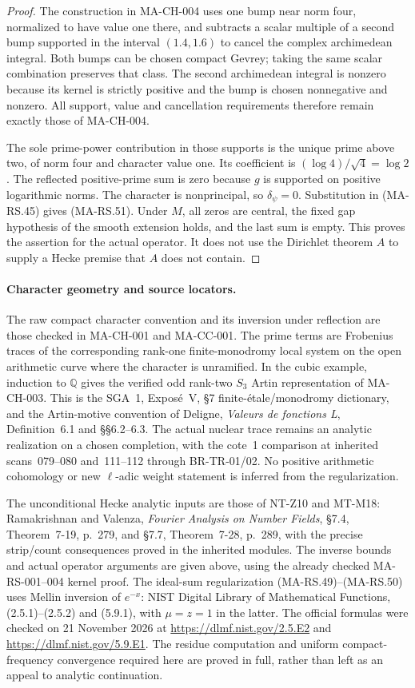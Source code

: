\begin{proof}
The construction in MA-CH-004 uses one bump near norm four,
normalized to have value one there, and subtracts a scalar
multiple of a second bump supported in the interval $(1.4,1.6)$
to cancel the complex archimedean integral. Both bumps can be
chosen compact Gevrey; taking the same scalar combination
preserves that class. The second archimedean integral is nonzero
because its kernel is strictly positive and the bump is chosen
nonnegative and nonzero. All support, value and cancellation
requirements therefore remain exactly those of MA-CH-004.

The sole prime-power contribution in those supports is the
unique prime above two, of norm four and character value one.
Its coefficient is $(\log4)/\sqrt4=\log2$.
The reflected positive-prime sum is zero because $g$ is
supported on positive logarithmic norms. The character is
nonprincipal, so $\delta_\psi=0$. Substitution in (MA-RS.45)
gives (MA-RS.51). Under $M$, all zeros are central, the fixed
gap hypothesis of the smooth extension holds, and the last sum
is empty. This proves the assertion for the actual operator.
It does not use the Dirichlet theorem $A$ to supply a Hecke
premise that $A$ does not contain.
\end{proof}

\paragraph{Character geometry and source locators.}
The raw compact character convention and its inversion under
reflection are those checked in MA-CH-001 and MA-CC-001.
The prime terms are Frobenius traces of the corresponding
rank-one finite-monodromy local system on the open arithmetic
curve where the character is unramified. In the cubic example,
induction to $\mathbb Q$ gives the verified odd rank-two
$S_3$ Artin representation of MA-CH-003.
This is the SGA~1, Expos\'e~V, \S7 finite-\'etale/monodromy
dictionary, and the Artin-motive convention of Deligne,
\emph{Valeurs de fonctions L}, Definition~6.1 and \S\S6.2--6.3.
The actual nuclear trace remains an analytic realization on a
chosen completion, with the cote~1 comparison at inherited
scans~079--080 and~111--112 through BR-TR-01/02.
No positive arithmetic cohomology or new $\ell$-adic weight
statement is inferred from the regularization.

The unconditional Hecke analytic inputs are those of NT-Z10
and MT-M18: Ramakrishnan and Valenza, \emph{Fourier Analysis on
Number Fields}, \S7.4, Theorem~7-19, p.~279, and \S7.7,
Theorem~7-28, p.~289, with the precise strip/count consequences
proved in the inherited modules. The inverse bounds and actual
operator arguments are given above, using the already checked
MA-RS-001--004 kernel proof. The ideal-sum regularization
(MA-RS.49)--(MA-RS.50) uses Mellin inversion of $e^{-x}$:
NIST Digital Library of Mathematical Functions,
(2.5.1)--(2.5.2) and (5.9.1), with $\mu=z=1$ in the latter.
The official formulas were checked on 21 November 2026 at
\url{https://dlmf.nist.gov/2.5.E2} and
\url{https://dlmf.nist.gov/5.9.E1}. The residue computation and
uniform compact-frequency convergence required here are proved
in full, rather than left as an appeal to analytic continuation.
